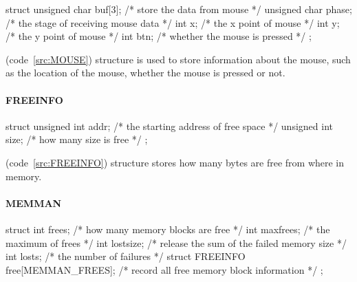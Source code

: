\documentclass{swfcthesis}
\begin{document}
\begin{listing}[H]
  \begin{codeblock}
\begin{ccode}
struct 
{ 
  unsigned char buf[3]; /* store the data from mouse */
  unsigned char phase;  /* the stage of receiving mouse data */
  int x;                /* the x point of mouse */
  int y;                /* the y point of mouse */
  int btn;              /* whether the mouse is pressed */
};
\end{ccode}
  \end{codeblock}
  \caption{\texttt{struct MOUSE\_DEC}}\label{src:MOUSE}
\end{listing}

(code~\ref{src:MOUSE}) structure is used to store information about the mouse, such as the
location of the mouse, whether the mouse is pressed or not.

\paragraph{FREEINFO}

\begin{listing}[H]
  \begin{codeblock}
\begin{ccode}
struct 
{ 
  unsigned int addr; /* the starting address of free space */
  unsigned int size; /* how many size is free */
};
\end{ccode}
  \end{codeblock}
  \caption{\texttt{struct FREEINFO}}\label{src:FREEINFO}
\end{listing}

(code~\ref{src:FREEINFO}) structure stores how many bytes are
free from where in memory.




\paragraph{MEMMAN}

\begin{listing}[H]
  \begin{codeblock}
\begin{ccode}
struct 
{ 
  int frees;                           /* how many memory blocks are free */
  int maxfrees;                        /* the maximum of frees */
  int lostsize;                        /* release the sum of the failed memory size */
  int losts;                           /* the number of failures */
  struct FREEINFO free[MEMMAN_FREES];  /* record all free memory block information */
};
\end{ccode}
  \end{codeblock}
  \caption{\texttt{struct MEMMAN}}\label{src:MEMMAN}
\end{listing}
\end{document}
